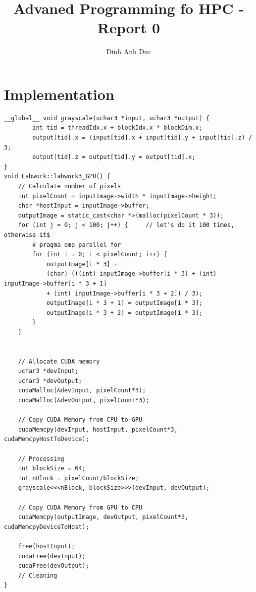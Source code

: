\documentclass{article}
\title{Advaned Programming fo HPC - Report 0}
\author{Dinh Anh Duc}
\begin{document}
\maketitle

\section*{Implementation}
\begin{lstlisting}
__global__ void grayscale(uchar3 *input, uchar3 *output) {
        int tid = threadIdx.x + blockIdx.x * blockDim.x;
        output[tid].x = (input[tid].x + input[tid].y + input[tid].z) / 3;
        output[tid].z = output[tid].y = output[tid].x;
}
void Labwork::labwork3_GPU() {
    // Calculate number of pixels
    int pixelCount = inputImage->width * inputImage->height;
    char *hostInput = inputImage->buffer;
    outputImage = static_cast<char *>(malloc(pixelCount * 3));
    for (int j = 0; j < 100; j++) {     // let's do it 100 times, otherwise it$
        # pragma omp parallel for
        for (int i = 0; i < pixelCount; i++) {
            outputImage[i * 3] = 
            (char) (((int) inputImage->buffer[i * 3] + (int) inputImage->buffer[i * 3 + 1] 
            + (int) inputImage->buffer[i * 3 + 2]) / 3);
            outputImage[i * 3 + 1] = outputImage[i * 3];
            outputImage[i * 3 + 2] = outputImage[i * 3];
        }
    }


    // Allocate CUDA memory
    uchar3 *devInput;
    uchar3 *devOutput;
    cudaMalloc(&devInput, pixelCount*3);
    cudaMalloc(&devOutput, pixelCount*3);

    // Copy CUDA Memory from CPU to GPU
    cudaMemcpy(devInput, hostInput, pixelCount*3, cudaMemcpyHostToDevice);

    // Processing
    int blockSize = 64;
    int nBlock = pixelCount/blockSize;
    grayscale<<<nBlock, blockSize>>>(devInput, devOutput);

    // Copy CUDA Memory from GPU to CPU
    cudaMemcpy(outputImage, devOutput, pixelCount*3, cudaMemcpyDeviceToHost);

    free(hostInput);
    cudaFree(devInput);
    cudaFree(devOutput);
    // Cleaning
}

\end{lstlisting}
\end{document}

